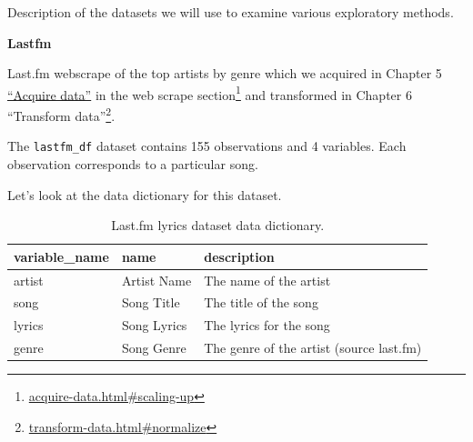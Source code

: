 \documentclass[
]{article}
\newenvironment{Shaded}{\begin{snugshade}}{\end{snugshade}}
\newcommand{\CommentTok}[1]{\textcolor[rgb]{0.56,0.35,0.01}{\textit{#1}}}
\newcommand{\FunctionTok}[1]{\textcolor[rgb]{0.00,0.00,0.00}{#1}}
\newcommand{\NormalTok}[1]{#1}
\DeclareRobustCommand{\href}[2]{#2\footnote{\url{#1}}}
\begin{document}
Description of the datasets we will use to examine various exploratory methods.

\textbf{Lastfm}

Last.fm webscrape of the top artists by genre which we acquired in Chapter 5 \protect\hyperlink{acquire-data}{``Acquire data''} in the \href{acquire-data.html\#scaling-up}{web scrape section} and transformed in Chapter 6 \href{transform-data.html\#normalize}{``Transform data''}.

\begin{Shaded}
\end{Shaded}

The \texttt{lastfm\_df} dataset contains 155 observations and 4 variables. Each observation corresponds to a particular song.

Let's look at the data dictionary for this dataset.

\begin{table}

\caption{\label{tab:eda-lastfm-data-dictionary-preview}Last.fm lyrics dataset data dictionary.}
\centering
\begin{tabular}[t]{lll}
\toprule
variable\_name & name & description\\
\midrule
artist & Artist Name & The name of the artist\\
song & Song Title & The title of the song\\
lyrics & Song Lyrics & The lyrics for the song\\
genre & Song Genre & The genre of the artist (source last.fm)\\
\bottomrule
\end{tabular}
\end{table}
\end{document}
